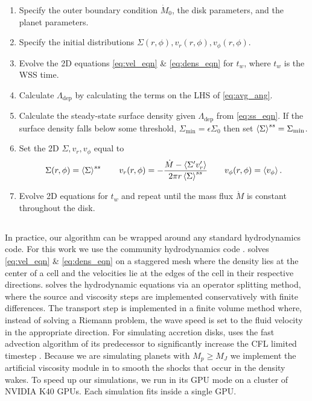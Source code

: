 \begin{enumerate}
\item Specify the outer boundary condition $\dot{M}_0$, the disk parameters, and the planet parameters.
\item Specify the initial distributions $\Sigma(r,\phi), v_r(r,\phi), v_\phi(r,\phi)$.
\item Evolve the 2D equations \eqref{eq:vel_eqn} \& \eqref{eq:dens_eqn} for $t_w$, where $t_w$ is the WSS time.
\item Calculate $\Lambda_\text{dep}$ by calculating the terms on the LHS of \eqref{eq:avg_ang}.
\item Calculate the steady-state surface density given $\Lambda_\text{dep}$ from \eqref{eq:ss_eqn}. If the surface density falls below some threshold, $\Sigma_\text{min} = \epsilon \Sigma_0$ then set $\left\langle \Sigma \right\rangle^{ss} = \Sigma_\text{min}$.
\item Set the 2D $\Sigma, v_r, v_\phi$ equal to
\begin{equation}
\Sigma(r,\phi) = \avg{\Sigma}^{ss} \qquad v_r(r,\phi) = - \frac{ \dot{M} - \avg{ \Sigma' v_r'}}{2 \pi r \avg{\Sigma}^{ss}} \qquad v_\phi(r,\phi) = \avg{v_\phi} .
\end{equation}
\item Evolve 2D equations for $t_w$ and repeat until the mass flux $\dot{M}$ is constant throughout the disk. 
\end{enumerate}

\subsection{\fargo}
In practice, our algorithm can be wrapped around any standard hydrodynamics code. For this work we use the community hydrodynamics code \fargo \citep{2016ApJS..223...11B}. \fargo solves \eqref{eq:vel_eqn} \& \eqref{eq:dens_eqn} on a staggered mesh where the density lies at the center of a cell and the velocities lie at the edges of the cell in their respective directions. \fargo solves the hydrodynamic equations via an operator splitting method, where the source and viscosity steps are implemented conservatively with finite differences. The transport step is implemented in a finite volume method where, instead of solving a Riemann problem, the wave speed is set to the fluid velocity in the appropriate direction. For simulating accretion disks, \fargo uses the fast advection algorithm of its predecessor to significantly increase the CFL limited timestep \citep{Masset:2000ku}. Because we are simulating planets with $M_p \ge M_J$ we implement the artificial viscosity module in \fargo to smooth the shocks that occur in the density wakes. To speed up our simulations, we run \fargo in its GPU mode on a cluster of NVIDIA K40 GPUs. Each simulation fits inside a single GPU. 

